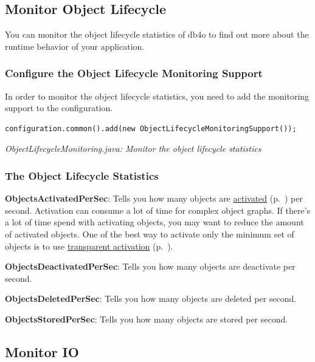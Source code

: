\subsection{Monitor Object Lifecycle}
\label{ref:advanced-topics-runtime-statistics-monitor-object-lifecycle}

You can monitor the object lifecycle statistics of db4o to find out more about the runtime behavior of your application.

\subsubsection*{Configure the Object Lifecycle Monitoring Support}

In order to monitor the object lifecycle statistics, you need to add the monitoring support to the configuration.

\begin{lstlisting}
configuration.common().add(new ObjectLifecycleMonitoringSupport());
\end{lstlisting}

{\small\itshape ObjectLifecycleMonitoring.java: Monitor the object lifecycle statistics\par}
\medskip

\subsubsection*{The Object Lifecycle Statistics}

\textbf{ObjectsActivatedPerSec}: Tells you how many objects are \hyperref[ref:basics-activation]{activated} (p.~\pageref{ref:basics-activation}) per second. Activation can consume a lot of time for complex object graphs. If there's a lot of time spend with activating objects, you may want to reduce the amount of activated objects. One of the best way to activate only the minimum set of objects is to use \hyperref[ref:basics-activation-concept-transparent-activation-framework]{transparent activation} (p.~\pageref{ref:basics-activation-concept-transparent-activation-framework}).

\textbf{ObjectsDeactivatedPerSec}: Tells you how many objects are deactivate per second.

\textbf{ObjectsDeletedPerSec}: Tells you how many objects are deleted per second.

\textbf{ObjectsStoredPerSec}: Tells you how many objects are stored per second.

\subsection{Monitor IO}
\label{ref:advanced-topics-runtime-statistics-monitor-io}

